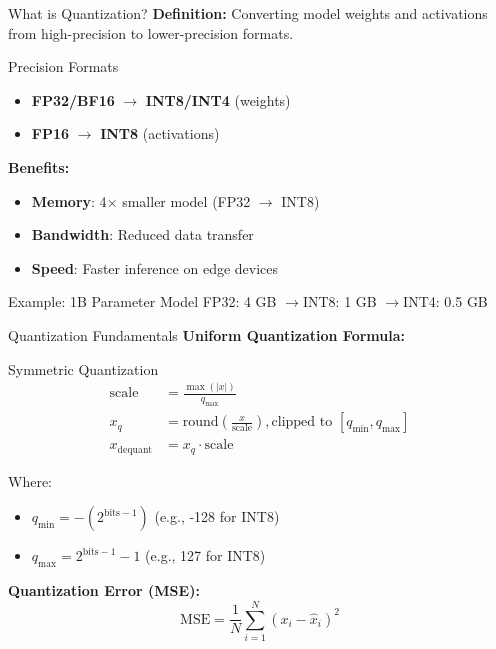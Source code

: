 \documentclass[aspectratio=169,10pt]{beamer}
\begin{document}
\begin{frame}{What is Quantization?}
    \textbf{Definition:} Converting model weights and activations from high-precision to lower-precision formats.

    \vspace{0.3cm}
    \begin{block}{Precision Formats}
        \begin{itemize}
            \item \textbf{FP32/BF16} $\to$ \textbf{INT8/INT4} (weights)
            \item \textbf{FP16} $\to$ \textbf{INT8} (activations)
        \end{itemize}
    \end{block}

    \vspace{0.3cm}
    \textbf{Benefits:}
    \begin{itemize}
        \item \textbf{Memory}: 4$\times$ smaller model (FP32 $\to$ INT8)
        \item \textbf{Bandwidth}: Reduced data transfer
        \item \textbf{Speed}: Faster inference on edge devices
    \end{itemize}

    \vspace{0.3cm}
    \begin{block}{Example: 1B Parameter Model}
        FP32: 4 GB \quad$\to$\quad INT8: 1 GB \quad$\to$\quad INT4: 0.5 GB
    \end{block}
\end{frame}

\begin{frame}{Quantization Fundamentals}
    \textbf{Uniform Quantization Formula:}

    \vspace{0.3cm}
    \begin{block}{Symmetric Quantization}
        \begin{align*}
            \text{scale} &= \frac{\max(|x|)}{q_{\max}} \\
            x_q &= \text{round}\left(\frac{x}{\text{scale}}\right), \text{clipped to } [q_{\min}, q_{\max}] \\
            x_{\text{dequant}} &= x_q \cdot \text{scale}
        \end{align*}
    \end{block}

    \vspace{0.1cm}
    Where:
    \begin{itemize}
        \item $q_{\min} = -(2^{\text{bits}-1})$ (e.g., -128 for INT8)
        \item $q_{\max} = 2^{\text{bits}-1} - 1$ (e.g., 127 for INT8)
    \end{itemize}

    \vspace{0.1cm}
    \textbf{Quantization Error (MSE):}
    $$\text{MSE} = \frac{1}{N}\sum_{i=1}^{N}(x_i - \hat{x}_i)^2$$
\end{frame}
\end{document}
